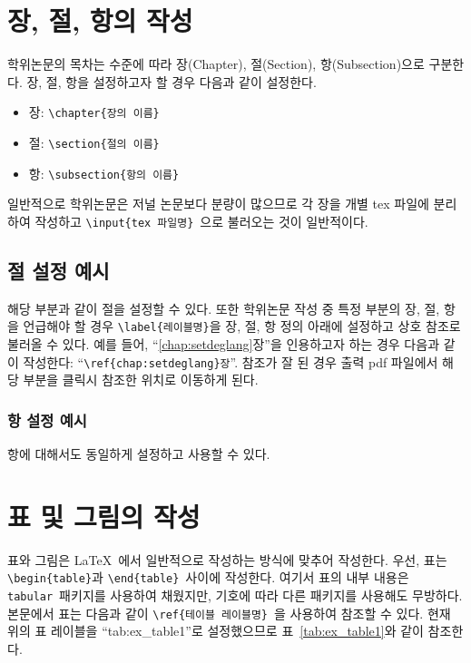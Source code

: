 \documentclass[ko]{UOSThesis}
\begin{document}
\newpage
\chapter{장, 절, 항의 작성}
\label{chap:setchapter}

학위논문의 목차는 수준에 따라 장(Chapter), 절(Section), 항(Subsection)으로 구분한다. 장, 절, 항을 설정하고자 할 경우 다음과 같이 설정한다.
\begin{itemize}
\small
\singlespacing
    \item 장: \texttt{\textbackslash chapter\{장의 이름\}}
    \item 절: \texttt{\textbackslash section\{절의 이름\}}
    \item 항: \texttt{\textbackslash subsection\{항의 이름\}}
\end{itemize}

일반적으로 학위논문은 저널 논문보다 분량이 많으므로 각 장을 개별 tex 파일에 분리하여 작성하고 \texttt{\textbackslash input\{tex 파일명\}}~으로 불러오는 것이 일반적이다.

\section{절 설정 예시}

해당 부분과 같이 절을 설정할 수 있다. 또한 학위논문 작성 중 특정 부분의 장, 절, 항을 언급해야 할 경우 \texttt{\textbackslash label\{레이블명\}}을 장, 절, 항 정의 아래에 설정하고 상호 참조로 불러올 수 있다. 예를 들어, ``\ref{chap:setdeglang}장''을 인용하고자 하는 경우 다음과 같이 작성한다: ``\texttt{\textbackslash ref\{chap:setdeglang\}장}''. 참조가 잘 된 경우 출력 pdf 파일에서 해당 부분을 클릭시 참조한 위치로 이동하게 된다.

\subsection{항 설정 예시}

항에 대해서도 동일하게 설정하고 사용할 수 있다.

\chapter{표 및 그림의 작성}

표와 그림은 \LaTeX~에서 일반적으로 작성하는 방식에 맞추어 작성한다. 우선, 표는 \texttt{\textbackslash begin\{table\}}과 \texttt{\textbackslash end\{table\}}~사이에 작성한다. 여기서 표의 내부 내용은 \texttt{tabular}~패키지를 사용하여 채웠지만, 기호에 따라 다른 패키지를 사용해도 무방하다. 본문에서 표는 다음과 같이 \texttt{\textbackslash ref\{테이블 레이블명\}}~을 사용하여 참조할 수 있다. 현재 위의 표 레이블을 ``tab:ex\_table1''로 설정했으므로 표~\ref{tab:ex_table1}와 같이 참조한다.
\end{document}
